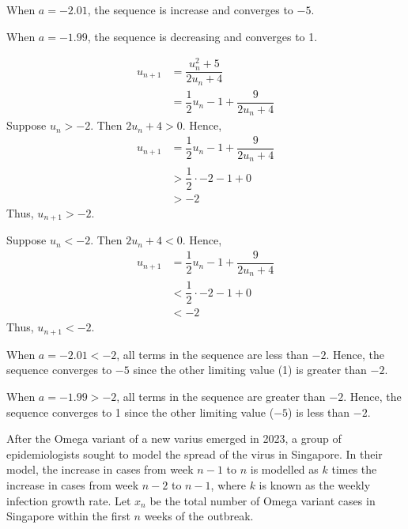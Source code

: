 \documentclass{jhwhw}
\begin{document}
            \subpart

                \noindent When $a = -2.01$, the sequence is increase and converges to $-5$. 
                
                \noindent When $a = -1.99$, the sequence is decreasing and converges to 1.

            \subpart
                \begin{align*}
                    u_{n+1} &= \dfrac{u_n^2 + 5}{2u_n + 4}\\
                    &= \dfrac12 u_n - 1 + \dfrac9{2u_n + 4}
                \end{align*}
                Suppose $u_n > -2$. Then $2u_n + 4 > 0$. Hence,
                \begin{align*}
                    u_{n+1} &= \dfrac12 u_n - 1 + \dfrac9{2u_n + 4}\\
                    &> \dfrac12 \cdot -2 - 1 + 0\\
                    &> -2
                \end{align*}
                Thus, $u_{n+1} > -2$.

                \medskip

                \noindent Suppose $u_n < -2$. Then $2u_n + 4 < 0$. Hence,
                \begin{align*}
                    u_{n+1} &= \dfrac12 u_n - 1 + \dfrac9{2u_n + 4}\\
                    &< \dfrac12 \cdot -2 - 1 + 0\\
                    &< -2
                \end{align*}
                Thus, $u_{n+1} < -2$.

                \medskip

                \noindent When $a = -2.01 < -2$, all terms in the sequence are less than $-2$. Hence, the sequence converges to $-5$ since the other limiting value (1) is greater than $-2$.

                \noindent When $a = -1.99 > -2$, all terms in the sequence are greater than $-2$. Hence, the sequence converges to 1 since the other limiting value ($-5$) is less than $-2$.

    \problem{}
        After the Omega variant of a new varius emerged in 2023, a group of epidemiologists sought to model the spread of the virus in Singapore. In their model, the increase in cases from week $n-1$ to $n$ is modelled as $k$ times the increase in cases from week $n-2$ to $n-1$, where $k$ is known as the weekly infection growth rate. Let $x_n$ be the total number of Omega variant cases in Singapore within the first $n$ weeks of the outbreak.
\end{document}
